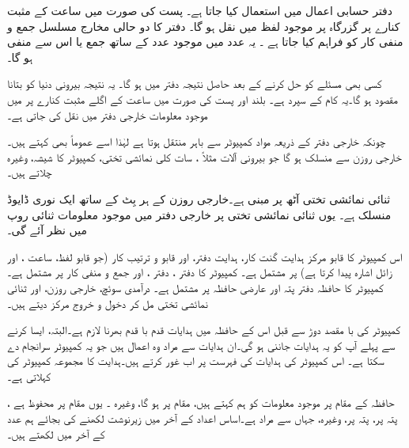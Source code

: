 دفتر  حسابی   اعمال میں  استعمال کیا جاتا ہے۔ پست  کی صورت میں ساعت کے مثبت کنارے  پر  گزرگاہ پر موجود لفظ  میں نقل ہو گا۔ دفتر  کا دو حالی مخارج مسلسل جمع و منفی کار کو فراہم کیا جاتا ہے ۔ یہ عدد  میں موجود عدد کے ساتھ جمع یا اس سے منفی ہو گا۔

کسی بھی مسئلے کو حل کرنے کے بعد حاصل نتیجہ دفتر  میں     ہو گا۔ یہ نتیجہ بیرونی دنیا کو بتانا مقصود ہو گا۔یہ کام  کے سپرد ہے۔ بلند  اور پست  کی صورت میں ساعت کے  اگلے  مثبت کنارے پر  میں موجود معلومات خارجی دفتر میں نقل کی جاتی ہے۔

چونکہ خارجی دفتر کے ذریعہ    مواد کمپیوٹر سے باہر منتقل ہوتا ہے لہٰذا اسے عموماً بھی  کہتے ہیں۔ خارجی روزن   سے منسلک ہو گا جو بیرونی آلات  مثلاً  ،   سات کلی نمائشی تختی،  کمپیوٹر کا شیشہ، وغیرہ چلاتے ہیں۔

ثنائی نمائشی تختی  آٹھ  پر مبنی ہے۔خارجی  روزن کے ہر بِٹ کے ساتھ ایک نوری ڈایوڈ منسلک ہے۔ یوں ثنائی نمائشی تختی  پر خارجی دفتر میں موجود  معلومات    ثنائی روپ میں نظر آئے گی۔

اس کمپیوٹر کا قابو مرکز ہدایت گنت کار، ہدایت دفتر، اور قابو و ترتیب کار  (جو قابو لفظ، ساعت ، اور زائل  اشارہ   پیدا کرتا ہے) پر مشتمل ہے۔ کمپیوٹر کا  دفتر ، دفتر ، اور جمع و منفی کار پر مشتمل ہے۔کمپیوٹر کا حافظہ  دفتر پتہ اور  عارضی حافظہ پر مشتمل ہے۔  درآمدی  سوئچ، خارجی روزن، اور ثنائی نمائشی تختی  مل کر   دخول و خروج مرکز دیتے ہیں۔

کمپیوٹر کی با مقصد دوڑ سے قبل اس کے حافظہ  میں ہدایات قدم با قدم  بھرنا لازم ہے۔البتہ، ایسا کرنے سے پہلے  آپ کو یہ ہدایات  جاننی  ہو گی۔ان ہدایات سے مراد وہ اعمال ہیں جو یہ کمپیوٹر سرانجام دے سکتا ہے۔ اس کمپیوٹر کی ہدایات کی فہرست  پر اب غور کرتے ہیں۔ہدایت کا مجموعہ کمپیوٹر کی  کہلاتی ہے۔

حافظہ کے مقام  پر موجود معلومات کو ہم   کہتے ہیں، مقام  پر   ہو گا، وغیرہ ۔ یوں  مقام  پر محفوظ ہے ،  پتہ  پر،  پتہ  پر، وغیرہ، جہاں  سے مراد    ہے۔اساس  اعداد کے آخر میں  زیرنوشت  لکھنے کی بجائے ہم عدد کے آخر میں  لکھتے ہیں۔

